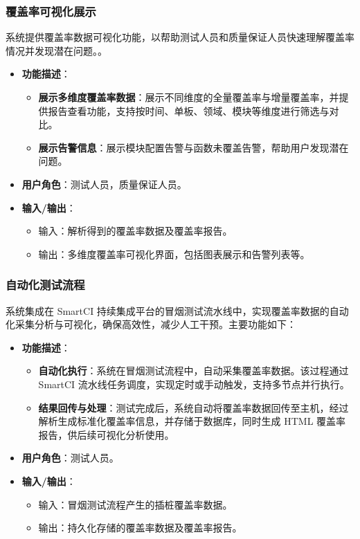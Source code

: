 \subsubsection{覆盖率可视化展示}
    系统提供覆盖率数据可视化功能，以帮助测试人员和质量保证人员快速理解覆盖率情况并发现潜在问题。。
    \begin{itemize}
        \item \textbf{功能描述}：
            \begin{itemize}
                \item \textbf{展示多维度覆盖率数据}：展示不同维度的全量覆盖率与增量覆盖率，并提供报告查看功能，支持按时间、单板、领域、模块等维度进行筛选与对比。
                \item \textbf{展示告警信息}：展示模块配置告警与函数未覆盖告警，帮助用户发现潜在问题。
            \end{itemize}
        \item \textbf{用户角色}：测试人员，质量保证人员。

        \item \textbf{输入/输出}：
        \begin{itemize}
            \item 输入：解析得到的覆盖率数据及覆盖率报告。
            \item 输出：多维度覆盖率可视化界面，包括图表展示和告警列表等。
        \end{itemize}
    \end{itemize}

\subsubsection{自动化测试流程}
    系统集成在 SmartCI 持续集成平台的冒烟测试流水线中，实现覆盖率数据的自动化采集分析与可视化，确保高效性，减少人工干预。主要功能如下：
    \begin{itemize}
        \item \textbf{功能描述}：
        \begin{itemize}
            \item \textbf{自动化执行}：系统在冒烟测试流程中，自动采集覆盖率数据。该过程通过 SmartCI 流水线任务调度，实现定时或手动触发，支持多节点并行执行。
            \item \textbf{结果回传与处理}：测试完成后，系统自动将覆盖率数据回传至主机，经过解析生成标准化覆盖率信息，并存储于数据库，同时生成 HTML 覆盖率报告，供后续可视化分析使用。
        \end{itemize}
        \item \textbf{用户角色}：测试人员。
        \item \textbf{输入/输出}：
        \begin{itemize}
            \item 输入：冒烟测试流程产生的插桩覆盖率数据。
            \item 输出：持久化存储的覆盖率数据及覆盖率报告。
        \end{itemize}
    \end{itemize}


